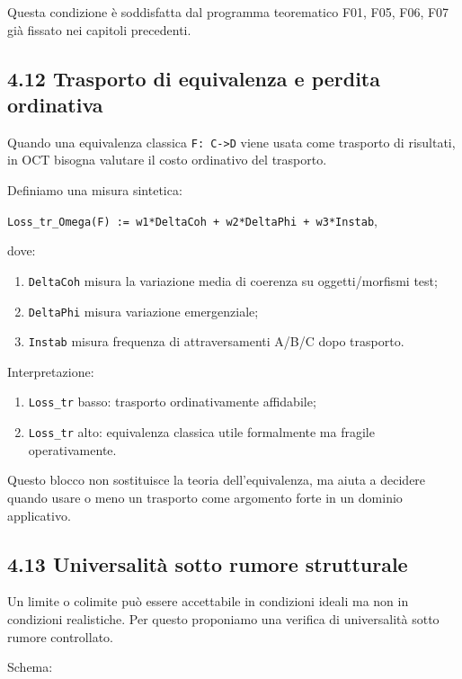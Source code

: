 Questa condizione è soddisfatta dal programma teorematico F01, F05, F06, F07 già fissato nei capitoli precedenti.

\subsection{4.12 Trasporto di equivalenza e perdita ordinativa}

Quando una equivalenza classica \texttt{F:\ C-\textgreater{}D} viene usata come trasporto di risultati, in OCT bisogna valutare il costo ordinativo del trasporto.

Definiamo una misura sintetica:

\texttt{Loss\_tr\_Omega(F)\ :=\ w1*DeltaCoh\ +\ w2*DeltaPhi\ +\ w3*Instab},

dove:

\begin{enumerate}
\def\labelenumi{\arabic{enumi}.}
\tightlist
\item
  \texttt{DeltaCoh} misura la variazione media di coerenza su oggetti/morfismi test;
\item
  \texttt{DeltaPhi} misura variazione emergenziale;
\item
  \texttt{Instab} misura frequenza di attraversamenti A/B/C dopo trasporto.
\end{enumerate}

Interpretazione:

\begin{enumerate}
\def\labelenumi{\arabic{enumi}.}
\tightlist
\item
  \texttt{Loss\_tr} basso: trasporto ordinativamente affidabile;
\item
  \texttt{Loss\_tr} alto: equivalenza classica utile formalmente ma fragile operativamente.
\end{enumerate}

Questo blocco non sostituisce la teoria dell'equivalenza, ma aiuta a decidere quando usare o meno un trasporto come argomento forte in un dominio applicativo.

\subsection{4.13 Universalità sotto rumore strutturale}

Un limite o colimite può essere accettabile in condizioni ideali ma non in condizioni realistiche. Per questo proponiamo una verifica di universalità sotto rumore controllato.

Schema:

